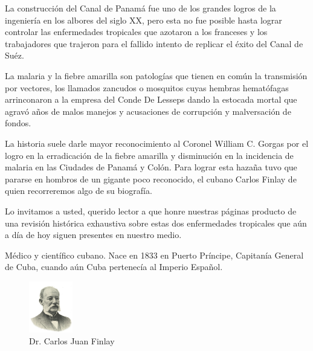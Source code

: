 \documentclass[a4paper]{article}
\date{\today}
\let\cite=\supercite
\begin{document}
\maketitle

\begin{multicols}{3}



La construcción del Canal de Panamá fue uno de los grandes logros de la
ingeniería en los albores del siglo XX, pero esta no fue posible hasta lograr
controlar las enfermedades tropicales que azotaron a los franceses y los
trabajadores que trajeron para el fallido intento de replicar el éxito
del Canal de Suéz.

La malaria y la fiebre amarilla son patologías que tienen en común la
transmisión por vectores, los llamados zancudos o mosquitos cuyas hembras
hematófagas arrinconaron a la empresa del Conde De Lesseps dando la estocada
mortal que agravó años de malos manejos y acusaciones de corrupción y
malversación de fondos.

La historia suele darle mayor reconocimiento al Coronel William C. Gorgas por
el logro en la erradicación de la fiebre amarilla y disminución en la
incidencia de malaria en las Ciudades de Panamá y Colón. Para lograr esta
hazaña tuvo que pararse en hombros de un gigante poco reconocido, el
cubano Carlos Finlay de quien recorreremos algo de su biografía.

Lo invitamos a usted, querido lector a que honre nuestras páginas
producto de una revisión histórica exhaustiva sobre estas dos enfermedades
tropicales que aún a día de hoy siguen presentes en nuestro medio.

\closearticle



Médico y científico cubano. Nace en 1833 en Puerto Príncipe, Capitanía
General de Cuba, cuando aún Cuba pertenecía al Imperio Español\cite{biojcf}.

\begin{figure}
	\begin{center}
		\vspace{-10pt}
		\includegraphics[width=0.17\textwidth]{cjfinlay.jpg}
	\end{center}
	\caption*{Dr. Carlos Juan Finlay}
\end{figure}


\end{multicols}
\end{document}

